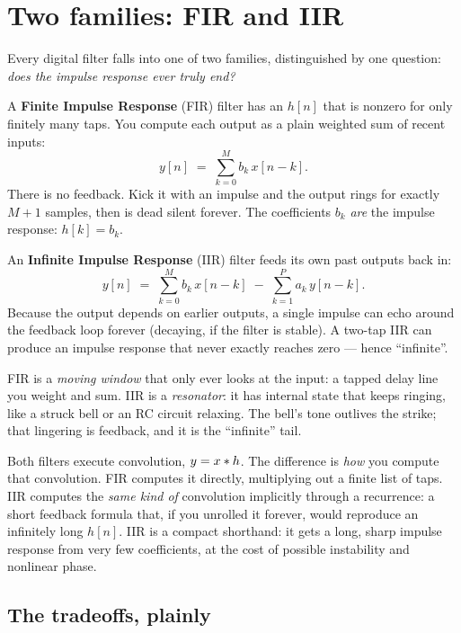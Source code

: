 \section{Two families: FIR and IIR}
\label{ch16:fir-iir}

Every digital filter falls into one of two families, distinguished by one
question: \emph{does the impulse response ever truly end?}

A \textbf{Finite Impulse Response} (FIR) filter has an $h[n]$ that is nonzero for
only finitely many taps. You compute each output as a plain weighted sum of recent
inputs:
\[
y[n] \;=\; \sum_{k=0}^{M} b_k\, x[n-k].
\]
There is no feedback. Kick it with an impulse and the output rings for exactly
$M+1$ samples, then is dead silent forever. The coefficients $b_k$ \emph{are} the
impulse response: $h[k] = b_k$.

An \textbf{Infinite Impulse Response} (IIR) filter feeds its own past outputs
back in:
\[
y[n] \;=\; \sum_{k=0}^{M} b_k\, x[n-k] \;-\; \sum_{k=1}^{P} a_k\, y[n-k].
\]
Because the output depends on earlier outputs, a single impulse can echo around
the feedback loop forever (decaying, if the filter is stable). A two-tap IIR can
produce an impulse response that never exactly reaches zero --- hence
``infinite''.

\begin{intuitionbox}
FIR is a \emph{moving window} that only ever looks at the input: a tapped delay
line you weight and sum. IIR is a \emph{resonator}: it has internal state that
keeps ringing, like a struck bell or an RC circuit relaxing. The bell's tone
outlives the strike; that lingering is feedback, and it is the ``infinite'' tail.
\end{intuitionbox}

\begin{happeningbox}
Both filters execute convolution, $y = x \ast h$. The difference is
\emph{how} you compute that convolution. FIR computes it directly, multiplying out
a finite list of taps. IIR computes the \emph{same kind of} convolution
implicitly through a recurrence: a short feedback formula that, if you unrolled it
forever, would reproduce an infinitely long $h[n]$. IIR is a compact shorthand:
it gets a long, sharp impulse response from very few coefficients, at the cost of
possible instability and nonlinear phase.
\end{happeningbox}

\subsection{The tradeoffs, plainly}
\label{ch16:tradeoffs}

